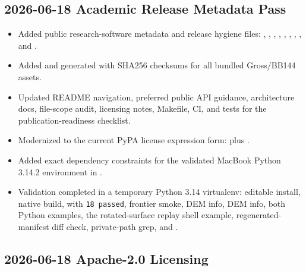 \subsection*{2026-06-18 Academic Release Metadata Pass}

\begin{itemize}
\item Added public research-software metadata and release hygiene files: \texttt{}, \texttt{}, \texttt{}, \texttt{}, \texttt{}, \texttt{}, \texttt{}, \texttt{}, and \texttt{}.
\item Added \texttt{} and generated \texttt{} with SHA256 checksums for all bundled Gross/BB144 assets.
\item Updated README navigation, preferred public API guidance, architecture docs, file-scope audit, licensing notes, Makefile, CI, and tests for the publication-readiness checklist.
\item Modernized \texttt{} to the current PyPA license expression form: \texttt{} plus \texttt{}.
\item Added exact dependency constraints for the validated MacBook Python 3.14.2 environment in \texttt{}.
\item Validation completed in a temporary Python 3.14 virtualenv: editable install, native build, \texttt{} with \texttt{18 passed}, frontier smoke, \texttt{} DEM info, \texttt{} DEM info, both Python examples, the rotated-surface replay shell example, regenerated-manifest diff check, private-path grep, and \texttt{}.
\end{itemize}

\subsection*{2026-06-18 Apache-2.0 Licensing}


